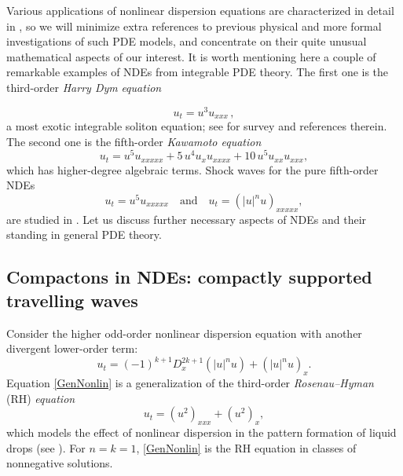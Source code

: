 \documentclass[12pt]{amsart}
\begin{document}
Various applications of nonlinear dispersion equations are
characterized in detail in \cite{GPnde}, so we will minimize extra
references to previous physical and more formal investigations of
such PDE models, and concentrate on their quite unusual
mathematical aspects of our interest.
 It is worth  mentioning here
 a couple of remarkable  examples of NDEs from integrable
 PDE theory. The first one is the third-order  {\em Harry Dym}
 {\em equation}
 
  \begin{equation}
 \label{HD0}
  u_t = u^3 u_{xxx} \, ,
  \end{equation}
  a  most exotic integrable soliton equation; see
\cite[\S~4.7]{GSVR} for survey and references
 therein.  The second one is the fifth-order  {\em
Kawamoto equation} \cite{Kaw85}
 $$
 u_t = u^5 u_{xxxxx}+ 5 \,u^4 u_x u_{xxxx}+ 10 \,u^5 u_{xx}
 u_{xxx},
$$
 which
  has higher-degree algebraic terms.
Shock waves for the pure fifth-order NDEs
 $$
 u_t=u^5 u_{xxxxx} {\quad \mbox{and} \quad} u_t=(|u|^n u)_{xxxxx},
 $$
 are studied in \cite{GalNDE5}.
   Let us discuss further
  necessary aspects of NDEs and their standing in general PDE
  theory.

\subsection{Compactons in NDEs: compactly supported travelling waves}

Consider the higher odd-order nonlinear dispersion equation  with
another divergent lower-order term:
\begin{equation}
\label{GenNonlin} u_t = (-1)^{k+1}D^{2k+1}_x(|u|^nu)+ (|u|^n u)_x.
\end{equation}
Equation \eqref{GenNonlin} is a generalization of the  third-order
{\em Rosenau--Hyman} (RH) {\em equation}
\begin{equation}
 \label{RH11}
u_t = (u^2)_{xxx} + (u^2)_x,
\end{equation}
which models the effect of nonlinear dispersion in the pattern
formation of liquid drops (see \cite{Compactons}).  For $n=k=1$,
\eqref{GenNonlin} is the RH equation in classes of nonnegative
solutions.
\end{document}
